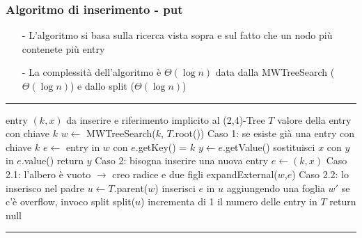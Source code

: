 \documentclass[a4paper]{article}
\makeatletter
\newenvironment{algo}[4]{
	\noindent\rule{\textwidth}{0.4pt}
	\begin{algorithmic}[1]
		\addtocounter{ALG@line}{-1}
		\Procedure{#1}{#2}
		\Require #3
		\Ensure #4
		\Statex }{
		\EndProcedure
	\end{algorithmic}
	\rule{\textwidth}{0.4pt}}
\makeatother
\begin{document}
\subsubsection*{Algoritmo di inserimento - put}
\begin{itemize}[topsep=3pt, itemsep=0pt]
	\item[-] L'algoritmo si basa sulla ricerca vista sopra e sul fatto che un nodo più contenete più entry
	\item[-] La complessità dell'algoritmo è \(\Theta(\log n)\) data dalla MWTreeSearch (\(\Theta(\log n)\)) e dallo split (\(\Theta(\log n)\))
\end{itemize}
\begin{algo}{put}{$k$, $x$}{entry $(k,x)$ da inserire e riferimento implicito al (2,4)-Tree $T$}{valore della entry con chiave $k$}
	\State $w \gets$ MWTreeSearch($k$, $T$.root())
	 \Comment Caso 1: se esiste già una entry con chiave $k$
		\State $e \gets $ entry in $w$ con $e$.getKey() = $k$
		\State $y \gets e$.getValue()
		\State sostituisci $x$ con $y$ in $e$.value()
		\State return $y$
	\Else \Comment Caso 2: bisogna inserire una nuova entry
		\State $e \gets (k,x)$
		 \Comment Caso 2.1: l'albero è vuoto $\rightarrow$ creo radice e due figli
			\State expandExternal($w$,$e$)
		\Else \Comment Caso 2.2: lo inserisco nel padre
			\State $u \gets T$.parent($w$)
			\State inserisci $e$ in $u$ aggiungendo una foglia $w'$
			 \Comment se c'è overflow, invoco split
				\State split($u$)
			\EndIf	
		\EndIf
		\State incrementa di 1 il numero delle entry in $T$
		\State return null
	\EndIf
\end{algo}

\newpage
\end{document}
